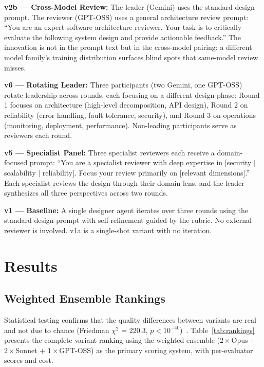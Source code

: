 \documentclass[conference]{IEEEtran}
\begin{document}
\textbf{v2b --- Cross-Model Review:} The leader (Gemini) uses the standard design prompt. The reviewer (GPT-OSS) uses a general architecture review prompt: ``You are an expert software architecture reviewer. Your task is to critically evaluate the following system design and provide actionable feedback.'' The innovation is not in the prompt text but in the cross-model pairing: a different model family's training distribution surfaces blind spots that same-model review misses.

\textbf{v6 --- Rotating Leader:} Three participants (two Gemini, one GPT-OSS) rotate leadership across rounds, each focusing on a different design phase: Round 1 focuses on architecture (high-level decomposition, API design), Round 2 on reliability (error handling, fault tolerance, security), and Round 3 on operations (monitoring, deployment, performance). Non-leading participants serve as reviewers each round.

\textbf{v5 --- Specialist Panel:} Three specialist reviewers each receive a domain-focused prompt: ``You are a specialist reviewer with deep expertise in [security $|$ scalability $|$ reliability]. Focus your review primarily on [relevant dimensions].'' Each specialist reviews the design through their domain lens, and the leader synthesizes all three perspectives across two rounds.

\textbf{v1 --- Baseline:} A single designer agent iterates over three rounds using the standard design prompt with self-refinement guided by the rubric. No external reviewer is involved. v1a is a single-shot variant with no iteration.
\section{Results}

\subsection{Weighted Ensemble Rankings}

Statistical testing confirms that the quality differences between variants are real and not due to chance (Friedman $\chi^2$ = 220.3, $p < 10^{-40}$)~\cite{friedman}. Table~\ref{tab:rankings} presents the complete variant ranking using the weighted ensemble ($2\times$Opus + $2\times$Sonnet + $1\times$GPT-OSS) as the primary scoring system, with per-evaluator scores and cost.
\end{document}
